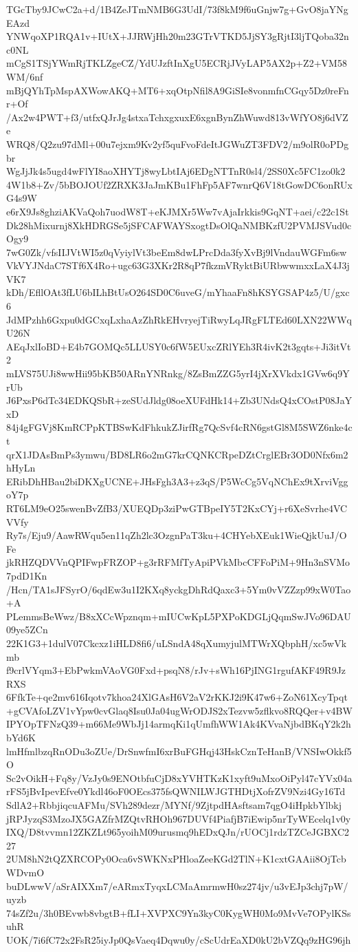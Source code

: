 TGcTby9JCwC2a+d/1B4ZeJTmNMB6G3UdI/73f8kM9f6uGnjw7g+GvO8jaYNgEAzd
YNWqoXP1RQA1v+IUtX+JJRWjHh20m23GTrVTKD5JjSY3gRjtI3ljTQoba32nc0NL
mCgS1TSjYWmRjTKLZgeCZ/YdUJzftInXgU5ECRjJVyLAP5AX2p+Z2+VM58WM/6nf
mBjQYhTpMspAXWowAKQ+MT6+xqOtpNfil8A9GiSIe8vonmfnCGqy5Dz0reFnr+Of
/Ax2w4PWT+f3/utfxQJrJg4stxaTchxgxuxE6xgnBynZhWuwd813vWfYO8j6dVZe
WRQ8/Q2zu97dMl+00u7ejxm9Kv2yf5quFvoFdeItJGWuZT3FDV2/m9olR0oPDgbr
WgJjJk4s5ugd4wFlYI8aoXHYTj8wyLbtIAj6EDgNTTnR0sl4/2SS0Xc5FC1zo0k2
4W1b8+Zv/5bBOJOUf2ZRXK3JaJmKBu1FhFp5AF7wnrQ6V18tGowDC6onRUxG4s9W
e6rX9Js8ghziAKVaQoh7uodW8T+eKJMXr5Ww7vAjaIrkkis9GqNT+aei/c22c1St
Dk28hMixurnj8XkHDRGSe5jSFCAFWAYSxogtDsOlQaNMBKzfU2PVMJSVud0cOgy9
7wG0Zk/vfsIIJVtWI5z0qVyiylVt3beEm8dwLPrcDda3fyXvBj9lVndauWGFm6sw
VkVYJNdaC7STf6X4Ro+ugc63G3XKr2R8qP7fkzmVRyktBiURbwwmxxLaX4J3jVK7
kDh/EfllOAt3fLU6bILhBtUsO264SD0C6uveG/mYhaaFn8hKSYGSAP4z5/U/gxc6
JdMPzhh6Gxpu0dGCxqLxhaAzZhRkEHvryejTiRwyLqJRgFLTEd60LXN22WWqU26N
AEqJxlIoBD+E4b7GOMQc5LLUSY0c6fW5EUxcZRlYEh3R4ivK2t3gqts+Ji3itVt2
mLVS75UJi8wwHii95bKB50ARnYNRnkg/8ZsBmZZG5yrI4jXrXVkdx1GVw6q9YrUb
J6PxsP6dTc34EDKQSbR+zeSUdJldg08oeXUFdHk14+Zb3UNdsQ4xCOstP08JaYxD
84j4gFGVj8KmRCPpKTBSwKdFhkukZJirfRg7QcSvf4cRN6gstGl8M5SWZ6nke4ct
qrX1JDAsBmPs3ymwu/BD8LR6o2mG7krCQNKCRpeDZtCrglEBr3OD0Nfx6m2hHyLn
ERibDhHBau2biDKXgUCNE+JHsFgh3A3+z3qS/P5WcCg5VqNChEx9tXrviVggoY7p
RT6LM9eO25swenBvZfB3/XUEQDp3ziPwGTBpeIY5T2KxCYj+r6XeSvrhe4VCVVfy
Ry7s/Eju9/AawRWqu5en11qZh2lc3OzgnPaT3ku+4CHYebXEuk1WieQjkUuJ/OFe
jkRHZQDVVnQPIFwpFRZOP+g3rRFMfTyApiPVkMbcCFFoPiM+9Hn3nSVMo7pdD1Kn
/Hcn/TA1sJFSyrO/6qdEw3u1I2KXq8yckgDhRdQaxc3+5Ym0vVZZzp99xW0Tao+A
PLemmsBeWwz/B8xXCcWpznqm+mIUCwKpL5PXPoKDGLjQqmSwJVo96DAU09ye5ZCn
22K1G3+1dulV07Ckcxz1iHLD8fi6/uLSndA48qXumyjulMTWrXQbphH/xc5wVkmb
f9crlVYqm3+EbPwkmVAoVG0Fxd+psqN8/rJv+sWh16PjING1rgufAKF49R9JzRXS
6FfkTe+qe2mv616Iqotv7khoa24XlGAsH6V2aV2rKKJ2i9K47w6+ZoN61XcyTpqt
+gCVAfoLZV1vYpw0cvGlaq8Isu0Ja04ugWrODJS2xTezvw5zflkvo8RQQer+v4BW
IPYOpTFNzQ39+m66Me9WbJj14armqKi1qUmfhWW1Ak4KVvaNjbdBKqY2k2hbYd6K
lmHfmlbzqRnODu3oZUe/DrSnwfmI6xrBuFGHqj43HskCznTeHanB/VNSIwOkkf5O
Sc2vOikH+Fq8y/VzJy0s9ENOtbfuCjD8xYVHTKzK1xyft9uMxoOiPyl47cYVx04a
rFS5jBvIpevEfve0Ykdl46oF0OEcs375fsQWNILWJGTHDtjXofrZV9Nzi4Gy16Td
SdlA2+RbbjiqcuAFMu/SVh289dezr/MYNf/9ZjtpdHAsftsam7qgO4iHpkbYlbkj
jRPJyzqS3MzoJX5GAZfrMZQtvRHOh967DUVf4PiafjB7iEwip5nrTyWEcelq1v0y
IXQ/D8tvvmn12ZKZLt965yoihM09urusmq9hEDxQJn/rUOCj1rdzTZCeJGBXC227
2UM8hN2tQZXRCOPy0Oca6vSWKNxPHloaZeeKGd2TlN+K1cxtGAAii8OjTcbWDvmO
buDLwwV/aSrAIXXm7/eARmxTyqxLCMaAmrmwH0sz274jv/u3vEJp3chj7pW/uyzb
74sZf2u/3h0BEvwb8vbgtB+fLI+XVPXC9Yn3kyC0KygWH0Mo9MvVe7OPylKSsuhR
UOK/7i6fC72x2FsR25iyJp0QsVaeq4Dqwu0y/cScUdrEaXD0kU2bVZQq9zHG96jh
